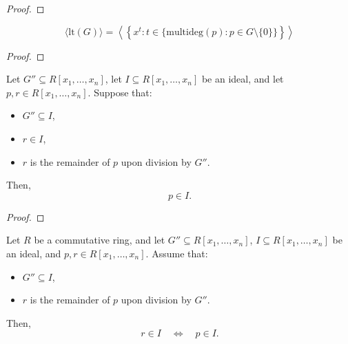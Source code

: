         \begin{proof}
          
          \leanok
        \end{proof}
        

        \begin{lemma}\label{leadingTerm_ideal_span_monomial’}
          \leanok
          \[
\langle \mathrm{lt}(G) \rangle = \left\langle \left\{ x^t : t \in \{ \mathrm{multideg}(p) : p \in G \setminus \{0\} \} \right\} \right\rangle
\]

        \end{lemma}
        
        \begin{proof}
          \leanok
        \end{proof}
        

        \begin{lemma}\label{mem_ideal_of_remainder_mem_ideal}
          \leanok
          Let \( G'' \subseteq R[x_1, \dots, x_n] \), let \( I \subseteq R[x_1, \dots, x_n] \) be an ideal,
and let \( p, r \in R[x_1, \dots, x_n] \). Suppose that:
\begin{itemize}
  \item \( G'' \subseteq I \),
  \item \( r \in I \),
  \item \( r \) is the remainder of \( p \) upon division by \( G'' \).
\end{itemize}
Then,
\[
p \in I.
\]

        \end{lemma}
        
        \begin{proof}
          
          \leanok
        \end{proof}
        

        \begin{lemma}\label{remainder_mem_ideal_iff}
          \leanok
          Let \( R \) be a commutative ring, and let \( G'' \subseteq R[x_1, \dots, x_n] \), \( I \subseteq R[x_1, \dots, x_n] \) be an ideal, and \( p, r \in R[x_1, \dots, x_n] \).
Assume that:
\begin{itemize}
  \item \( G'' \subseteq I \),
  \item \( r \) is the remainder of \( p \) upon division by \( G'' \).
\end{itemize}
Then,
\[
r \in I \quad \Longleftrightarrow \quad p \in I.
\]

        \end{lemma}
        
